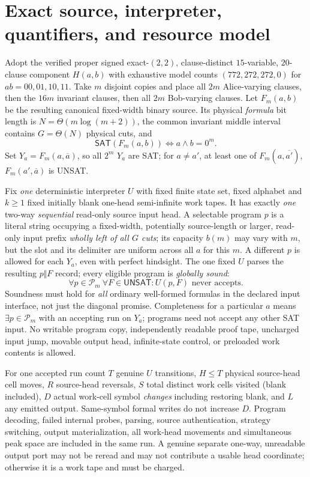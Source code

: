 \documentclass[11pt]{article}
\newcommand{\SAT}{\mathsf{SAT}}
\newcommand{\UNSAT}{\mathsf{UNSAT}}
\begin{document}
\section{Exact source, interpreter, quantifiers, and resource model}
Adopt the verified proper signed exact-$(2,2)$, clause-distinct
$15$-variable, $20$-clause component $H(a,b)$ with exhaustive model counts
$(772,272,272,0)$ for $ab=00,01,10,11$.
Take $m$ disjoint copies and place all $2m$ Alice-varying clauses,
then the $16m$ invariant clauses, then all $2m$ Bob-varying clauses.
Let $F_m(a,b)$ be the resulting canonical fixed-width binary source.
Its physical \emph{formula} bit length is $N=\Theta(m\log(m+2))$, the
common invariant middle interval contains $G=\Theta(N)$ physical cuts,
and
\[
 \SAT(F_m(a,b))\Longleftrightarrow a\wedge b=0^m.
 \tag{1}
\]
Set $Y_a=F_m(a,\overline a)$, so all $2^m$ $Y_a$ are SAT; for $a\ne a'$,
at least one of $F_m(a,\overline {a'})$, $F_m(a',\overline a)$ is UNSAT.

Fix \emph{one} deterministic interpreter $U$ with fixed finite state set,
fixed alphabet and $k\ge1$ fixed initially blank one-head semi-infinite
work tapes.  It has exactly \emph{one} two-way \emph{sequential} read-only
source input head.  A selectable program $p$ is a literal string
occupying a fixed-width, potentially source-length or larger, read-only
input prefix \emph{wholly left of all $G$ cuts}; its capacity $b(m)$
may vary with $m$, but the slot and its delimiter are uniform across
all $a$ for this $m$.  A different $p$ is allowed for each $Y_a$, even
with perfect hindsight.  The one fixed $U$ parses the resulting
$p\Vert F$ record; every eligible program is \emph{globally sound}:
\[
 \boxed{\quad\forall p\in\mathcal P_m\ \forall F\in\UNSAT:
                 U(p,F)\text{ never accepts.}\quad}
 \tag{2}
\]
Soundness must hold for \emph{all} ordinary well-formed formulas in the
declared input interface, not just the diagonal promise.  Completeness
for a particular $a$ means $\exists p\in\mathcal P_m$ with an accepting
run on $Y_a$; programs need not accept any other SAT input.
No writable program copy, independently readable proof tape, uncharged
input jump, movable output head, infinite-state control, or preloaded work
contents is allowed.

For one accepted run count $T$ genuine $U$ transitions,
$H\le T$ physical source-head cell moves, $R$ source-head reversals,
$S$ total distinct work cells visited (blank included),
$D$ actual work-cell symbol \emph{changes} including restoring blank,
and $L$ any emitted output.  Same-symbol formal writes do not increase
$D$.  Program decoding, failed internal probes, parsing, source
authentication, strategy switching, output materialization, all
work-head movements and simultaneous peak space are included in the
same run.  A genuine separate one-way, unreadable output port may not
be reread and may not contribute a usable head coordinate; otherwise
it is a work tape and must be charged.
\end{document}
